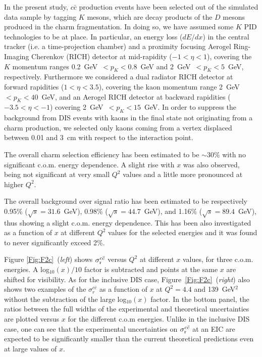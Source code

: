 \documentclass{PoS}
\begin{document}
In the present study, $c\bar{c}$ production events have been selected out of the simulated data sample by tagging $K$ mesons, which are decay products of the $D$ mesons produced in the charm fragmentation. In doing so, we have assumed some $K$ PID technologies to be at place. In particular, an energy loss ($dE/dx$) in the central tracker (i.e. a time-projection chamber) and a proximity focusing Aerogel Ring-Imaging Cherenkov (RICH) detector at mid-rapidity ($-1 < \eta < 1$), covering the $K$ momentum ranges 0.2~GeV~$< p_{K} < 0.8$~GeV and 2~GeV~$< p_{K} < 5$~GeV, respectively. Furthermore we considered a dual radiator RICH detector at forward rapidities ($1 < \eta < 3.5$), covering the kaon momentum range 2~GeV~$< p_{K} < 40$~GeV, and an Aerogel RICH detector at backward rapidities ($-3.5 < \eta < -1$)  covering 2~GeV~$< p_{K} < 15$~GeV.  
In order to suppress the background from DIS events with kaons in the final state not originating from a charm production, we selected only kaons coming from a vertex displaced between 0.01 and 3~cm with respect to the interaction point. 

The overall charm selection efficiency has been estimated to be $\sim30\%$ with no significant c.o.m. energy dependence.
A slight rise with $x$ was also observed, being not significant at very small $Q^{2}$ values and a little more pronounced at higher $Q^{2}$. 

The overall background over signal ratio has been estimated to be respectively 0.95\% ($\sqrt{s} = 31.6$~GeV), 0.98\% ($\sqrt{s} = 44.7$~GeV), and 1.16\%  
($\sqrt{s} = 89.4$~GeV), thus showing a slight c.o.m. energy dependence. This has been also investigated as a function of $x$ at different $Q^{2}$ values for the selected energies and it 
was found to never significantly exceed 2\%.


Figure \ref{Fig:F2c}~({\it left}) shows $\sigma^{c\bar{c}}_{\rm r}$ versus $Q^2$ at different $x$ values, for three c.o.m. energies. 
A log$_{10}(x)/10$ factor is subtracted and points at the same $x$ are shifted for visibility. 
As for the inclusive DIS case, Figure~\ref{Fig:F2c}~({\it right}) also shows two examples of the $\sigma_{r}^{c\bar{c}}$ as a function of $x$ at 
$Q^{2 } = 4.4$ and 139~GeV$^{2}$ without the subtraction of the large log$_{10}(x)$ factor. In the bottom panel, the ratios between the full widths of the experimental and theoretical uncertainties are plotted versus $x$ for the different c.o.m energies. Unlike in the inclusive DIS case, one can see that the experimental uncertainties on $\sigma_{\rm r}^{c\bar{c}}$ at an EIC are expected to be significantly smaller than the current theoretical predictions even at large values of $x$.
\end{document}
